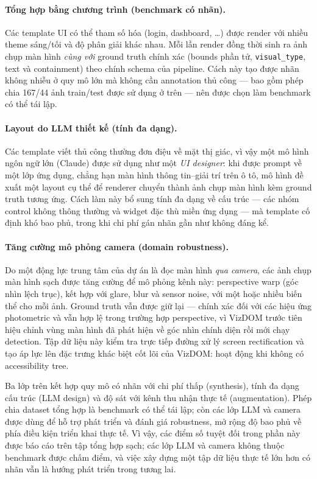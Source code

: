 \documentclass[11pt,a4paper]{article}
\newcommand{\code}[1]{\texttt{#1}}
\begin{document}
\paragraph{Tổng hợp bằng chương trình (benchmark có nhãn).} Các template UI có thể
tham số hóa (login, dashboard, \dots) được render với nhiều theme sáng/tối và độ
phân giải khác nhau. Mỗi lần render đồng thời sinh ra ảnh chụp màn hình
\emph{cùng với} ground truth chính xác (bounds phần tử,
\code{visual\_type}, text và containment) theo chính schema của pipeline. Cách này
tạo được nhãn không nhiễu ở quy mô lớn mà không cần annotation thủ công --- bao
gồm phép chia 167/44 ảnh train/test được sử dụng ở trên --- nên được chọn làm
benchmark có thể tái lập.

\paragraph{Layout do LLM thiết kế (tính đa dạng).} Các template viết thủ công
thường đơn điệu về mặt thị giác, vì vậy một mô hình ngôn ngữ lớn (Claude) được sử
dụng như một \emph{UI designer}: khi được prompt về một lớp ứng dụng, chẳng hạn
màn hình thông tin--giải trí trên ô tô, mô hình đề xuất một layout cụ thể để
renderer chuyển thành ảnh chụp màn hình kèm ground truth tương ứng. Cách làm này
bổ sung tính đa dạng về cấu trúc --- các nhóm control không thông thường và widget
đặc thù miền ứng dụng --- mà template cố định khó bao phủ, trong khi chi phí gán
nhãn gần như không đáng kể.

\paragraph{Tăng cường mô phỏng camera (domain robustness).} Do một động lực trung
tâm của dự án là đọc màn hình \emph{qua camera}, các ảnh chụp màn hình sạch được
tăng cường để mô phỏng kênh này: perspective warp (góc nhìn lệch trục), kết hợp
với glare, blur và sensor noise, với một hoặc nhiều biến thể cho mỗi ảnh. Ground
truth vẫn được giữ lại --- chính xác đối với các hiệu ứng photometric và vẫn hợp
lệ trong trường hợp perspective, vì VizDOM trước tiên hiệu chỉnh vùng màn hình đã
phát hiện về góc nhìn chính diện rồi mới chạy detection. Tập dữ liệu này kiểm tra
trực tiếp đường xử lý screen rectification và tạo áp lực lên đặc trưng khác biệt
cốt lõi của VizDOM: hoạt động khi không có accessibility tree.

Ba lớp trên kết hợp quy mô có nhãn với chi phí thấp (synthesis), tính đa dạng cấu
trúc (LLM design) và độ sát với kênh thu nhận thực tế (augmentation). Phép chia
dataset tổng hợp là benchmark có thể tái lập; còn các lớp LLM và camera được dùng
để hỗ trợ phát triển và đánh giá robustness, mở rộng độ bao phủ về phía điều kiện
triển khai thực tế. Vì vậy, các điểm số tuyệt đối trong phần này được báo cáo trên
tập tổng hợp sạch; các lớp LLM và camera không thuộc benchmark được chấm điểm, và
việc xây dựng một tập dữ liệu thực tế lớn hơn có nhãn vẫn là hướng phát triển trong
tương lai.
\end{document}
